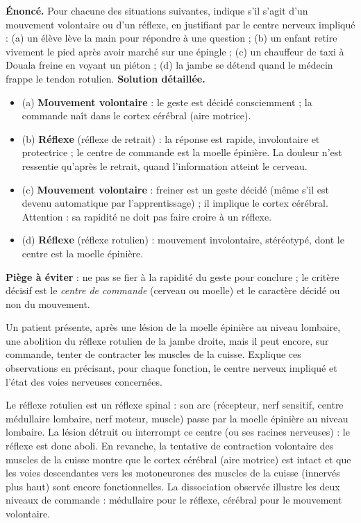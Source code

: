 \documentclass[11pt]{article}
\begin{document}
\begin{exoresolu}
\textbf{Énoncé.} Pour chacune des situations suivantes, indique s'il s'agit d'un mouvement volontaire ou d'un réflexe, en justifiant par le centre nerveux impliqué : (a) un élève lève la main pour répondre à une question ; (b) un enfant retire vivement le pied après avoir marché sur une épingle ; (c) un chauffeur de taxi à Douala freine en voyant un piéton ; (d) la jambe se détend quand le médecin frappe le tendon rotulien.
\tcblower
\textbf{Solution détaillée.}
\begin{itemize}
\item (a) \textbf{Mouvement volontaire} : le geste est décidé consciemment ; la commande naît dans le cortex cérébral (aire motrice).
\item (b) \textbf{Réflexe} (réflexe de retrait) : la réponse est rapide, involontaire et protectrice ; le centre de commande est la moelle épinière. La douleur n'est ressentie qu'après le retrait, quand l'information atteint le cerveau.
\item (c) \textbf{Mouvement volontaire} : freiner est un geste décidé (même s'il est devenu automatique par l'apprentissage) ; il implique le cortex cérébral. Attention : sa rapidité ne doit pas faire croire à un réflexe.
\item (d) \textbf{Réflexe} (réflexe rotulien) : mouvement involontaire, stéréotypé, dont le centre est la moelle épinière.
\end{itemize}
\textbf{Piège à éviter} : ne pas se fier à la rapidité du geste pour conclure ; le critère décisif est le \emph{centre de commande} (cerveau ou moelle) et le caractère décidé ou non du mouvement.
\end{exoresolu}

\begin{exercice}
Un patient présente, après une lésion de la moelle épinière au niveau lombaire, une abolition du réflexe rotulien de la jambe droite, mais il peut encore, sur commande, tenter de contracter les muscles de la cuisse. Explique ces observations en précisant, pour chaque fonction, le centre nerveux impliqué et l'état des voies nerveuses concernées.
\end{exercice}

\begin{corrige}
Le réflexe rotulien est un réflexe spinal : son arc (récepteur, nerf sensitif, centre médullaire lombaire, nerf moteur, muscle) passe par la moelle épinière au niveau lombaire. La lésion détruit ou interrompt ce centre (ou ses racines nerveuses) : le réflexe est donc aboli. En revanche, la tentative de contraction volontaire des muscles de la cuisse montre que le cortex cérébral (aire motrice) est intact et que les voies descendantes vers les motoneurones des muscles de la cuisse (innervés plus haut) sont encore fonctionnelles. La dissociation observée illustre les deux niveaux de commande : médullaire pour le réflexe, cérébral pour le mouvement volontaire.
\end{corrige}
\end{document}
